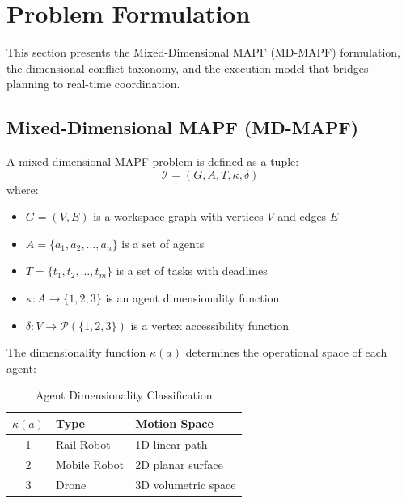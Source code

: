 \section{Problem Formulation}
\label{sec:problem}

This section presents the Mixed-Dimensional MAPF (MD-MAPF) formulation, the dimensional conflict taxonomy, and the execution model that bridges planning to real-time coordination.

\subsection{Mixed-Dimensional MAPF (MD-MAPF)}

\begin{definition}
A mixed-dimensional MAPF problem is defined as a tuple:
\begin{equation}
\mathcal{I} = (G, A, T, \kappa, \delta)
\end{equation}
where:
\begin{itemize}
    \item $G = (V, E)$ is a workspace graph with vertices $V$ and edges $E$
    \item $A = \{a_1, a_2, \ldots, a_n\}$ is a set of agents
    \item $T = \{t_1, t_2, \ldots, t_m\}$ is a set of tasks with deadlines
    \item $\kappa: A \rightarrow \{1, 2, 3\}$ is an agent dimensionality function
    \item $\delta: V \rightarrow \mathcal{P}(\{1, 2, 3\})$ is a vertex accessibility function
\end{itemize}
\end{definition}

The dimensionality function $\kappa(a)$ determines the operational space of each agent:

\begin{table}[htbp]
\centering
\caption{Agent Dimensionality Classification}
\label{tab:dimensionality}
\begin{tabular}{@{}cll@{}}
\toprule
$\kappa(a)$ & Type & Motion Space \\
\midrule
1 & Rail Robot & 1D linear path \\
2 & Mobile Robot & 2D planar surface \\
3 & Drone & 3D volumetric space \\
\bottomrule
\end{tabular}
\end{table}

